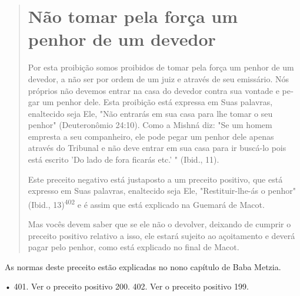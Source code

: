 \begin{quote}
\section{Não tomar pela força um penhor de um devedor}

Por esta proibição somos proibidos de tomar pela força um penhor de um
devedor, a não ser por ordem de um juiz e através de seu emissário. Nós
próprios não devemos entrar na casa do devedor contra sua vontade e
pe­gar um penhor dele. Esta proibição está expressa em Suas palavras,
enaltecido seja Ele, "Não entrarás em sua casa para lhe tomar o seu
penhor" (Deuteronô­mio 24:10). Como a Mishná diz: "Se um homem empresta
a seu companheiro, ele pode pegar um penhor dele apenas através do
Tribunal e não deve entrar em sua casa para ir buscá-lo pois está
escrito 'Do lado de fora ficarás etc.' " (Ibid., 11).

Este preceito negativo está justaposto a um preceito positivo, que está
expresso em Suas palavras, enaltecido seja Ele, "Restituir-lhe-ás o
penhor" (Ibid., 13)\textsuperscript{402} e é assim que está explicado na
Guemará de Macot.

Mas vocês devem saber que se ele não o devolver, deixando de cum­prir o
preceito positivo relativo a isso, ele estará sujeito ao açoitamento e
deve­rá pagar pelo penhor, como está explicado no final de Macot.
\end{quote}

As normas deste preceito estão explicadas no nono capítulo de Baba
Metzia.

• 401. Ver o preceito positivo 200. 402. Ver o preceito positivo 199.

